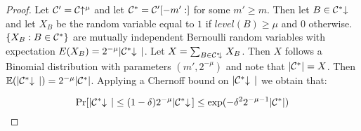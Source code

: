 \begin{proof}
Let $\mathcal{C}' = \mathcal{C}\negthickspace\uparrow^\mu$ and let $\mathcal{C}^* =
\mathcal{C}'[-m':]$ for some $m' \geq m$. Then let $B \in \mathcal{C}^*\negthickspace\downarrow\,$ and let
$X_B$ be the random variable equal to $1$ if $\textit{level}(B) \geq \mu$ and
$0$ otherwise. $\{ X_B: B \in \mathcal{C}^* \}$ are mutually independent Bernoulli
random variables with expectation $E(X_B) = 2^{-\mu}|\mathcal{C}^*\negthickspace\downarrow\,|$. Let
$X = \sum_{B \in \mathcal{C}^*\negthickspace\downarrow\,}{X_B}$. Then $X$ follows a Binomial
distribution with parameters $(m', 2^{-\mu})$ and note that $|\mathcal{C}^*| = X$.
Then $\mathbb{E}(|\mathcal{C}^*\negthickspace\downarrow\,|) = 2^{-\mu}|\mathcal{C}^*|$. Applying a Chernoff bound on
$|\mathcal{C}^*\negthickspace\downarrow\,|$ we obtain that:

\begin{equation*}
\Pr[|\mathcal{C}^*\negthickspace\downarrow\,| \leq (1 - \delta)2^{-\mu}|\mathcal{C}^*\negthickspace\downarrow\,] \leq
\exp(-\delta^2 2^{-\mu-1}|\mathcal{C}^*|)
\end{equation*}
\Qed
\end{proof}

